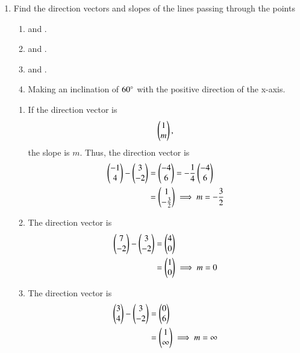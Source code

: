 \begin{enumerate}[label=\arabic*.,ref=\thesubsection.\theenumi]
\item Find the direction vectors and slopes of the lines passing through the points
%
\begin{enumerate}
\item {} and .
\item {} and .
\item {} and .
\item Making an inclination of $60\degree$ with the positive direction of the x-axis.
\end{enumerate}
%
\solution
\begin{enumerate}
\item If the direction vector is 
\begin{align}
\begin{pmatrix}1\\m\end{pmatrix}, 
\end{align}
%
the slope is $m$. Thus, the direction vector is
\begin{align}
\begin{pmatrix}-1\\4\end{pmatrix} - \begin{pmatrix}3\\-2\end{pmatrix} &= \begin{pmatrix}-4\\6\end{pmatrix} = -\frac{1}{4} \begin{pmatrix}-4\\6\end{pmatrix} 
\\
&=  \begin{pmatrix}1\\-\frac{3}{2}\end{pmatrix} \implies m = -\frac{3}{2}
\end{align}
%
\item The direction vector is
\begin{align}
\begin{pmatrix}7\\-2\end{pmatrix} - \begin{pmatrix}3\\-2\end{pmatrix} &= \begin{pmatrix}4\\0\end{pmatrix} 
\\
&=  \begin{pmatrix}1\\0\end{pmatrix} \implies m = 0
\end{align}
%
\item The direction vector is
\begin{align}
\begin{pmatrix}3\\4\end{pmatrix} - \begin{pmatrix}3\\-2\end{pmatrix} &= \begin{pmatrix}0\\6\end{pmatrix} 
\\
&=  \begin{pmatrix}1\\ \infty\end{pmatrix} \implies m = \infty
\end{align}

\end{enumerate}
\end{enumerate}
